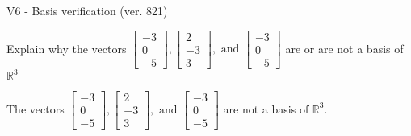 \begin{exercise}
  \begin{exerciseTitle}V6 - Basis verification (ver. 821)\end{exerciseTitle}
  \begin{exerciseStatement}
    Explain why the vectors \(\left[\begin{array}{r}
-3 \\
0 \\
-5
\end{array}\right] , \left[\begin{array}{r}
2 \\
-3 \\
3
\end{array}\right] , \text{ and } \left[\begin{array}{r}
-3 \\
0 \\
-5
\end{array}\right]\) are or are not a basis of \(\mathbb{R}^3\)	


  \end{exerciseStatement}
  \begin{exerciseAnswer}
   The vectors \(\left[\begin{array}{r}
-3 \\
0 \\
-5
\end{array}\right] , \left[\begin{array}{r}
2 \\
-3 \\
3
\end{array}\right] , \text{ and } \left[\begin{array}{r}
-3 \\
0 \\
-5
\end{array}\right]\) 
  	 are not  a basis of \(\mathbb{R}^3\).
  


  \end{exerciseAnswer}
\end{exercise}